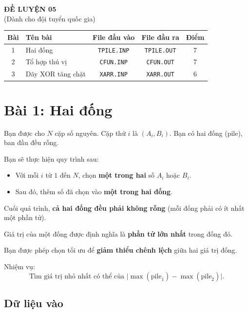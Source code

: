 \begin{center}
    {\LARGE \textbf{ĐỀ LUYỆN 05}}\\[6pt]
    {\large (Dành cho đội tuyển quốc gia)}
\end{center}

\begin{tabularx}{\textwidth}{|c|X|c|c|c|}
\hline
\textbf{Bài} & \textbf{Tên bài} & \textbf{File đầu vào} & \textbf{File đầu ra} & \textbf{Điểm} \\
\hline
1 & Hai đống & \texttt{TPILE.INP} & \texttt{TPILE.OUT} & 7 \\
\hline
2 & Tổ hợp thú vị & \texttt{CFUN.INP} & \texttt{CFUN.OUT} & 7 \\
\hline
3 & Dãy XOR tăng chặt & \texttt{XARR.INP} & \texttt{XARR.OUT} & 6 \\
\hline
\end{tabularx}



\section*{Bài 1: Hai đống}

Bạn được cho $N$ cặp số nguyên. Cặp thứ $i$ là $(A_i, B_i)$.  
Bạn có hai đống (pile), ban đầu đều rỗng.

Bạn sẽ thực hiện quy trình sau:

\begin{itemize}
    \item Với mỗi $i$ từ $1$ đến $N$, chọn \textbf{một trong hai} số $A_i$ hoặc $B_i$.
    \item Sau đó, thêm số đã chọn vào \textbf{một trong hai đống}.
\end{itemize}

Cuối quá trình, \textbf{cả hai đống đều phải không rỗng} (mỗi đống phải có ít nhất một phần tử).

Giá trị của một đống được định nghĩa là \textbf{phần tử lớn nhất} trong đống đó.

Bạn được phép chọn tối ưu để \textbf{giảm thiểu chênh lệch} giữa hai giá trị đống.

Nhiệm vụ:  
\[
\text{Tìm giá trị nhỏ nhất có thể của } \bigl| \max(\text{pile}_1) - \max(\text{pile}_2) \bigr|.
\]

\subsection*{Dữ liệu vào}

